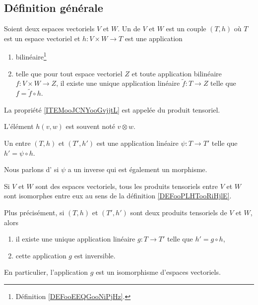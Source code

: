 \subsection{Définition générale}

\begin{definition}       \label{DEFooXKKQooAvWRNp}
	Soient deux espaces vectoriels \( V\) et \( W\). Un  de \( V\) et \( W\) est un couple \( (T,h)\) où \( T\) est un espace vectoriel et \( h\colon V\times W\to T\) est une application
	\begin{enumerate}
		\item
		      bilinéaire\footnote{Définition \ref{DEFooEEQGooNiPjHz}.}
		\item       \label{ITEMooJCNYooGvjjtL}
		      telle que pour tout espace vectoriel \( Z\) et toute application bilinéaire \( f\colon V\times W\to Z\), il existe une unique application linéaire \( \tilde f\colon T\to Z\) telle que \( f=\tilde f\circ h\).
	\end{enumerate}
	La propriété \ref{ITEMooJCNYooGvjjtL} est appelée  du produit tensoriel.

	L'élément \( h(v,w)\) est souvent noté \( v\otimes w\).
\end{definition}

\begin{definition}  \label{DEFooPLHTooRiHjlE}
	Un  entre \( (T,h)\) et \( (T',h')\) est une application linéaire \( \psi\colon T\to T'\) telle que \( h'=\psi\circ h\).

	Nous parlons d' si \( \psi\) a un inverse qui est également un morphisme.
\end{definition}

\begin{proposition}      \label{PROPooROPHooQXqNzZ}
	Si \( V\) et \( W\) sont des espaces vectoriels, tous les produits tensoriels entre \( V\) et \( W\) sont isomorphes entre eux au sens de la définition \ref{DEFooPLHTooRiHjlE}.

	Plus précisément, si \( (T,h)\) et \( (T',h')\) sont deux produits tensoriels de \( V\) et \( W\), alors
	\begin{enumerate}
		\item
		      il existe une unique application linéaire \( g\colon T\to T'\) telle que \( h'=g\circ h\),
		\item
		      cette application \( g\) est inversible.
	\end{enumerate}
	En particulier, l'application \( g\) est un isomorphisme d'espaces vectoriels.
\end{proposition}

